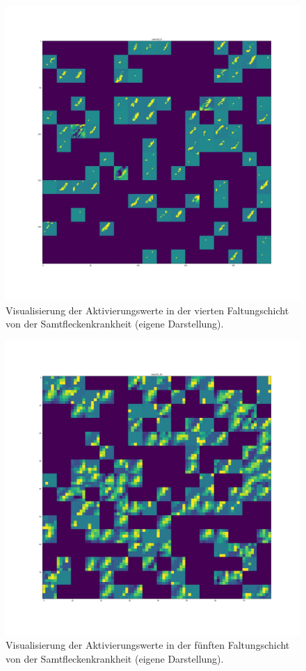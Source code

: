 \begin{figure}[h!]
	\centering
	\includegraphics[width=\textwidth]{visualisierungen/leaf_mold/activation/mold8.JPG}
	\caption{Visualisierung der Aktivierungswerte in der vierten Faltungschicht von der Samtfleckenkrankheit (eigene Darstellung).}
	\label{mold8_anhang}
\end{figure}

\begin{figure}[h!]
	\centering
	\includegraphics[width=\textwidth]{visualisierungen/leaf_mold/activation/mold10.JPG}
	\caption{Visualisierung der Aktivierungswerte in der fünften Faltungschicht von der Samtfleckenkrankheit (eigene Darstellung).}
	\label{}
\end{figure}



